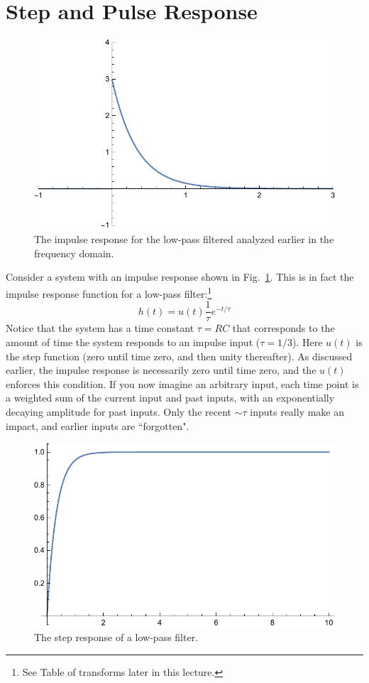 \section{Step and Pulse Response}
\begin{figure}[tb]
\begin{center}
\includegraphics[width=.6\columnwidth]{impulse_resp}
\end{center}
\caption{The impulse response for the low-pass filtered analyzed earlier in the frequency domain. }
\label{fig:impulse_resp}
\end{figure}
Consider a system with an impulse response shown in Fig.~\ref{fig:impulse_resp}.  This is in fact the impulse response function for a low-pass filter:\footnote{See Table of transforms later in this lecture.}
    \begin{equation}
        h(t) = u(t) \frac{1}{\tau} e^{-t/\tau}
    \end{equation}
Notice that the system has a time constant $\tau = RC$ that corresponds to the amount of time the system responds to an impulse input ($\tau = 1/3$).  Here $u(t)$ is the step function (zero until time zero, and then unity thereafter).  As discussed earlier, the impulse response is necessarily zero until time zero, and the $u(t)$ enforces this condition.  If you now imagine an arbitrary input, each time point is a weighted sum of the current input and past inputs, with an exponentially decaying amplitude for past inputs.  Only the recent $\sim \tau$ inputs really make an impact, and earlier inputs are ``forgotten".  
\begin{figure}[tb]
\begin{center}
\includegraphics[width=.5\columnwidth]{step_resp}
\end{center}
\caption{The step response of a low-pass filter. }
\label{fig:step_resp}
\end{figure}
